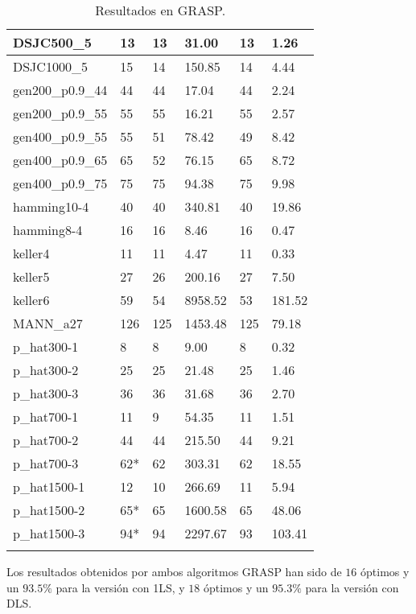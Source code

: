 \begin{small}
\begin{longtable}{l l l l l l}
    DSJC500\_5         & 13 & 13 & 31.00 & 13 & 1.26\\ \hline
    DSJC1000\_5        & 15 & 14 & 150.85 & 14 & 4.44\\ \hline
    gen200\_p0.9\_44   & 44 & 44 & 17.04 & 44 & 2.24\\ \hline
    gen200\_p0.9\_55   & 55 & 55 & 16.21 & 55 & 2.57\\ \hline
    gen400\_p0.9\_55   & 55 & 51 & 78.42 & 49 & 8.42\\ \hline
    gen400\_p0.9\_65   & 65 & 52 & 76.15 & 65 & 8.72\\ \hline
    gen400\_p0.9\_75   & 75 & 75 & 94.38 & 75 & 9.98\\ \hline
    hamming10-4        & 40 & 40 & 340.81 & 40 & 19.86\\ \hline
    hamming8-4         & 16 & 16 & 8.46 & 16 & 0.47\\ \hline
    keller4            & 11 & 11 & 4.47 & 11 & 0.33\\ \hline
    keller5            & 27 & 26 & 200.16 & 27 & 7.50\\ \hline
    keller6            & 59 & 54 & 8958.52 & 53 & 181.52\\ \hline
    MANN\_a27          & 126 & 125 & 1453.48 & 125 & 79.18\\ \hline
    p\_hat300-1        & 8 & 8 & 9.00 & 8 & 0.32\\ \hline
    p\_hat300-2        & 25 & 25 & 21.48 & 25 & 1.46\\ \hline
    p\_hat300-3        & 36 & 36 & 31.68 & 36 & 2.70\\ \hline
    p\_hat700-1        & 11 & 9 & 54.35 & 11 & 1.51\\ \hline
    p\_hat700-2        & 44 & 44 & 215.50 & 44 & 9.21\\ \hline
    p\_hat700-3        & 62* & 62 & 303.31 & 62 & 18.55\\ \hline
    p\_hat1500-1       & 12 & 10 & 266.69 & 11 & 5.94 \\ \hline
    p\_hat1500-2       & 65* & 65 & 1600.58 & 65 & 48.06\\ \hline
    p\_hat1500-3       & 94* & 94 & 2297.67 & 93 & 103.41\\ \hline
  \caption{Resultados en GRASP.}
\end{longtable}
\end{small}

Los resultados obtenidos por ambos algoritmos GRASP han sido de $16$ óptimos y un
$93.5\%$ para la versión con 1LS, y $18$ óptimos y un $95.3\%$ para la versión con DLS.


